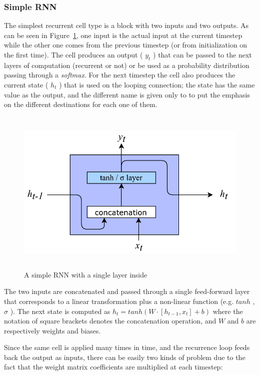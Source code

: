 \subsubsection{Simple RNN}
The simplest recurrent cell type is a block with two inputs and two outputs. As can be seen in Figure~\ref{fig:simpleRNN}, one input is the actual input at the current timestep while the other one comes from the previous timestep (or from initialization on the first time). The cell produces an output ( \( y_{t} \) ) that can be passed to the next layers of computation (recurrent or not) or be used as a probability distribution passing through a \textit{softmax}. For the next timestep the cell also produces the current state ( \( h_{t} \) ) that is used on the looping connection; the state has the same value as the output, and the different name is given only to to put the emphasis on the different destinations for each one of them.

\begin{figure}[!htbp]
    \centering
    \includegraphics[max width=\linewidth,max height=8cm,keepaspectratio]{figures/simpleRNN}
    \caption{A simple RNN with a single layer inside}\label{fig:simpleRNN}
\end{figure}

The two inputs are concatenated and passed through a single feed-forward layer that corresponds to a linear transformation plus a non-linear function (e.g.  \( tanh \) ,  \(  \sigma  \) ). The next state is computed as  \( h_{t}=tanh \left( W\cdot  \left[ h_{t-1}, x_{t} \right]  + b \right)  \)  where the notation of square brackets denotes the concatenation operation, and  \( W \)  and  \( b \)  are respectively weights and biases.

Since the same cell is applied many times in time, and the recurrence loop feeds back the output as inputs, there can be easily two kinds of problem due to the fact that the weight matrix coefficients are multiplied at each timestep:

